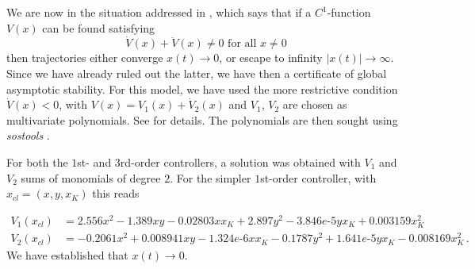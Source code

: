 \documentclass[12pt, a4paper,reqno]{amsart}
\theoremstyle{definition}
\begin{document}
We are now in the situation addressed in \cite[Corollary]{yorke1970theorem}, which says that if a $C^1$-function $V(x)$ can be found satisfying
\begin{equation}
    \label{yorke}
\dot{V}(x) + \ddot{V}(x) \not= 0 \mbox{ for all } x\not=0
\end{equation}
then trajectories either converge $x(t)\to 0$, or escape to infinity $|x(t)|\to \infty$. 
Since we have already ruled out the latter, we
have then a certificate of global asymptotic stability.
For this model, we have used the more restrictive condition $\dot V(x) < 0$, with
$V(x) = V_1(x) + \dot V_2(x)$ and $V_1$, $V_2$ are chosen as multivariate polynomials. See \cite{ahmadi2011higher} for details. The polynomials are then sought using {\it sostools} \cite{sostools}.

For both the $1$st- and $3$rd-order controllers, a solution was obtained with  $V_1$ and $V_2$  sums of  monomials of degree $2$. For the simpler $1$st-order controller, with $x_{cl} = (x,y,x_K)$  this reads 

\begin{equation*}\begin{split}
V_1(x_{cl}) & = 2.556x^2 - 1.389x y - 0.02803 x x_K + 2.897 y^2 - 3.846e\text{-}5y x_K + 0.003159 x_K^2 \\
V_2(x_{cl}) & = - 0.2061 x^2 + 0.008941 x y - 1.324e\text{-}6 x x_K - 0.1787y^2 +
1.641e\text{-}5 y x_K - 0.008169 x_K^2\,.
\end{split}\end{equation*}
We have established that  $x(t)\to 0$. 
\end{document}
